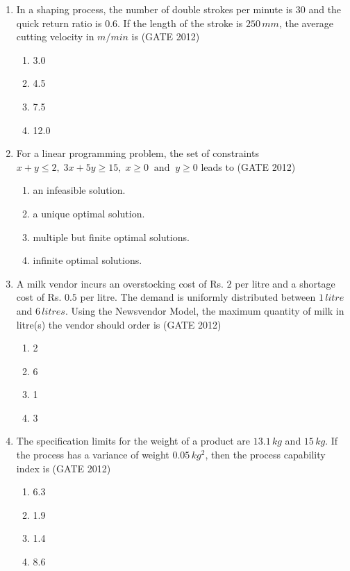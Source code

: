 \documentclass[journal,12pt,onecolumn]{IEEEtran}
\theoremstyle{remark}
\begin{document}
\begin{enumerate}
\item In a shaping process, the number of double strokes per minute is 30 and the quick return ratio is 0.6. 
If the length of the stroke is $250 \, mm$, the average cutting velocity in $m/min$ is  
\hfill{(GATE 2012)}

\begin{enumerate}
\item 3.0
\item 4.5
\item 7.5
\item 12.0
\end{enumerate}
\vspace{1cm}

\item For a linear programming problem, the set of constraints $x+y \leq 2, \; 3x+5y \geq 15, \; x \geq 0 \;\; \text{and} \;\; y \geq 0$ leads to  
\hfill{(GATE 2012)}

\begin{enumerate}
\item an infeasible solution.
\item a unique optimal solution.
\item multiple but finite optimal solutions.
\item infinite optimal solutions.
\end{enumerate}
\vspace{1cm}

\item A milk vendor incurs an overstocking cost of Rs. $2$ per litre and a shortage cost of Rs. $0.5$ per litre. 
The demand is uniformly distributed between $1 \, litre$ and $6 \, litres$. Using the Newsvendor Model, the maximum quantity of milk in litre(s) the vendor should order is  
\hfill{(GATE 2012)}

\begin{enumerate}
\item 2
\item 6
\item 1
\item 3
\end{enumerate}
\vspace{1cm}

\item The specification limits for the weight of a product are $13.1 \, kg$ and $15 \, kg$. 
If the process has a variance of weight $0.05 \, kg^2$, then the process capability index is  
\hfill{(GATE 2012)}

\begin{enumerate}
\item 6.3
\item 1.9
\item 1.4
\item 8.6
\end{enumerate}
\vspace{1cm}


\end{enumerate}
\end{document}
